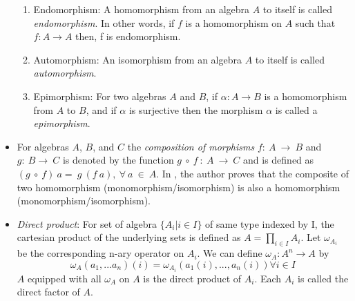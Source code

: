 \begin{itemize}
\begin{enumerate}
        \item Endomorphism: A homomorphism from an algebra $A$ to itself is
        called \textit{endomorphism}. In other words, if $f$ is a homomorphism on $A$
        such that $f:A\rightarrow A$ then, f is endomorphism.

        \item Automorphism: An isomorphism from an algebra $A$ to itself is
        called \textit{automorphism}.

        \item Epimorphism: For two algebras $A$ and $B$, if \(\alpha : A
        \rightarrow B \) is a homomorphism from $A$ to $B$, and if \(\alpha\) is
        surjective then the morphism \(\alpha\) is called a
        \textit{epimorphism}.
    \end{enumerate}

    \item For algebras $A$, $B$, and $C$ the \textit{composition of morphisms}
    $f:\ A \ \rightarrow \ B$ and $g:\ B \rightarrow\ C$ is denoted by the
    function $g\ \circ \ f\ :\ A\ \rightarrow \ C$ and is defined as $(g\ \circ \
    f)\ a = \ g\ (f\ a), \ \forall \ a\ \in\ A$. In \cite{sankappanavar1981course},
    the author proves that the composite of two homomorphism
    (monomorphism/isomorphism) is also a homomorphism
    (monomorphism/isomorphism).

    \item \textit{Direct product}: For set of algebra $\{ A_i | i \in I \}$ of
    same type indexed by I, the cartesian product of the underlying sets is
    defined as $A = \displaystyle \prod_{i\in I} A_i$. Let $\omega_{A_i}$ be the
    corresponding n-ary operator on $A_i$. We can define $\omega_A : A^{n}
    \rightarrow A$ by \[ \omega_A(a_1,...a_n)(i) = \omega{_A_i}
    (a_1(i),...,a_n(i)) \forall i \in I\] $A$ equipped with all $\omega_A$ on
    $A$ is the direct product of $A_i$. Each $A_i$ is called the direct factor
    of $A$.

\end{itemize}
